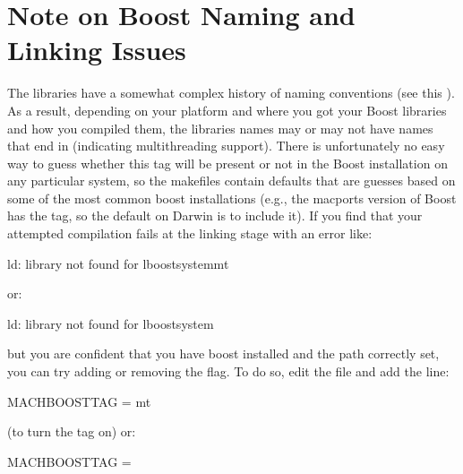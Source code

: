 \documentclass[letterpaper,10pt,english]{sphinxmanual}
\begin{document}
\section{Note on Boost Naming and Linking Issues}
\label{\detokenize{compiling:note-on-boost-naming-and-linking-issues}}
The  libraries have a somewhat complex
history of naming conventions (see this ). As
a result, depending on your platform and where you got your Boost
libraries and how you compiled them, the libraries names may or may
not have names that end in  (indicating multithreading
support). There is unfortunately no easy way to guess whether this tag
will be present or not in the Boost installation on any particular
system, so the  makefiles contain defaults that are guesses
based on some of the most common boost installations (e.g., the
macports version of Boost has the  tag, so the default on
Darwin is to include it). If you find that your attempted compilation
fails at the linking stage with an error like:

\begin{sphinxVerbatim}[commandchars=\\\{\}]
ld: library not found for \PYGZhy{}lboost\PYGZus{}system\PYGZhy{}mt
\end{sphinxVerbatim}

or:

\begin{sphinxVerbatim}[commandchars=\\\{\}]
ld: library not found for \PYGZhy{}lboost\PYGZus{}system
\end{sphinxVerbatim}

but you are confident that you have boost installed and the path
correctly set, you can try adding or removing the  flag. To do
so, edit the file  and add the line:

\begin{sphinxVerbatim}[commandchars=\\\{\}]
MACH\PYGZus{}BOOST\PYGZus{}TAG          = \PYGZhy{}mt
\end{sphinxVerbatim}

(to turn the  tag on) or:

\begin{sphinxVerbatim}[commandchars=\\\{\}]
MACH\PYGZus{}BOOST\PYGZus{}TAG          =
\end{sphinxVerbatim}
\end{document}
